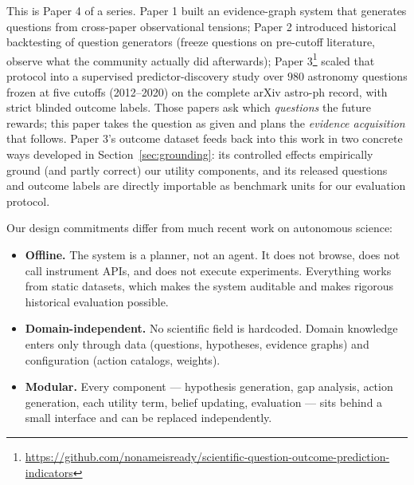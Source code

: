 \documentclass[11pt]{article}
\begin{document}
This is Paper 4 of a series. Paper 1 built an evidence-graph system that
generates questions from cross-paper observational tensions; Paper 2
introduced historical backtesting of question generators (freeze
questions on pre-cutoff literature, observe what the community actually
did afterwards); Paper 3\footnote{\url{https://github.com/nonameisready/scientific-question-outcome-prediction-indicators}}
scaled that protocol into a supervised predictor-discovery study over
$980$ astronomy questions frozen at five cutoffs (2012--2020) on the
complete arXiv astro-ph record, with strict blinded outcome labels.
Those papers ask which \emph{questions} the future rewards; this paper
takes the question as given and plans the \emph{evidence acquisition}
that follows. Paper 3's outcome dataset feeds back into this work in two
concrete ways developed in Section~\ref{sec:grounding}: its controlled
effects empirically ground (and partly correct) our utility components,
and its released questions and outcome labels are directly importable as
benchmark units for our evaluation protocol.

Our design commitments differ from much recent work on autonomous
science:

\begin{itemize}
  \item \textbf{Offline.} The system is a planner, not an agent. It does
  not browse, does not call instrument APIs, and does not execute
  experiments. Everything works from static datasets, which makes the
  system auditable and makes rigorous historical evaluation possible.
  \item \textbf{Domain-independent.} No scientific field is hardcoded.
  Domain knowledge enters only through data (questions, hypotheses,
  evidence graphs) and configuration (action catalogs, weights).
  \item \textbf{Modular.} Every component --- hypothesis generation, gap
  analysis, action generation, each utility term, belief updating,
  evaluation --- sits behind a small interface and can be replaced
  independently.
\end{itemize}
\end{document}
